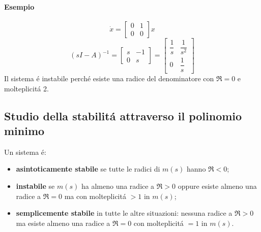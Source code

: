 \documentclass[../main.tex]{subfiles}
\begin{document}
		\begin{mdframed}[style=Esempio]
			\paragraph{Esempio}
			\[ 
				\dot x =
				\begin{bmatrix} 
					0 & 1\\
					0 & 0 
				\end{bmatrix} x
			\]
			\[
				(sI-A)^{-1} = 
				\begin{bmatrix} 
					s & -1\\
					0 & s
				\end{bmatrix} = 
				\begin{bmatrix} 
					\dfrac{1}{s} & \dfrac{1}{s^2}
					\\[1em]
					0 & \dfrac{1}{s}
				\end{bmatrix}
			\]
			Il sistema \'e instabile perch\'e esiste una radice del denominatore con $ \Re = 0 $ e molteplicit\'a 2.
		\end{mdframed}
		
	\subsection{Studio della stabilit\'a attraverso il polinomio minimo}
		Un sistema \'e:
		\begin{itemize}
			\item
				\textbf{asintoticamente stabile} se tutte le radici di $ m(s) $ hanno $ \Re < 0 $;
			\item
				\textbf{instabile} se $ m(s) $ ha almeno una radice a $ \Re > 0 $ oppure esiste almeno una radice a $ \Re = 0 $ ma con molteplicit\'a $ >1 $ in $ m(s) $;
			\item
				\textbf{semplicemente stabile} in tutte le altre situazioni: nessuna radice a $ \Re > 0 $ ma esiste almeno una radice a $ \Re = 0 $ con molteplicit\'a $ =1 $ in $ m(s) $.
		\end{itemize}
	
\end{document}
